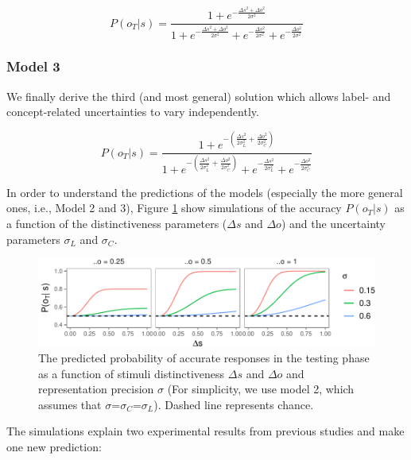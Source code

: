 \documentclass[english,,man,floatsintext]{apa6}
\theoremstyle{definition}
\theoremstyle{definition}
\theoremstyle{definition}
\theoremstyle{remark}
\begin{document}
\begin{equation} \label{eq:model2}
P(o_T|s)= \frac{1 + e^{- \frac{\Delta s^2 + \Delta o^2}{2\sigma^2}}}{1 + e^{-\frac{\Delta s^2 + \Delta o^2}{2\sigma^2}}+ e^{-\frac{\Delta s^2}{2\sigma^2}} + e^{-\frac{\Delta o^2}{2\sigma^2}}}
\end{equation}

\subsubsection{Model 3}\label{model-3}

We finally derive the third (and most general) solution which allows
label- and concept-related uncertainties to vary independently.

\begin{equation} \label{eq:model3}
P(o_T|s)= \frac{1 + e^{- (\frac{\Delta s^2}{2\sigma_L^2}+ \frac{\Delta o^2}{2\sigma_C^2})}}{1 + e^{-(\frac{\Delta s^2}{2\sigma_L^2}+ \frac{\Delta o^2}{2\sigma_C^2})}+ e^{-\frac{\Delta s^2}{2\sigma_L^2}} + e^{-\frac{\Delta o^2}{2\sigma_C^2}}}
\end{equation}

In order to understand the predictions of the models (especially the
more general ones, i.e., Model 2 and 3), Figure \ref{fig:simulation}
show simulations of the accuracy \(P(o_T|s)\) as a function of the
distinctiveness parameters (\(\Delta s\) and \(\Delta o\)) and the
uncertainty parameters \(\sigma_L\) and \(\sigma_C\).

\begin{figure}[htbp]
\centering
\includegraphics{ms_full_files/figure-latex/simulation-1.pdf}
\caption{\label{fig:simulation}The predicted probability of accurate
responses in the testing phase as a function of stimuli distinctiveness
\(\Delta s\) and \(\Delta o\) and representation precision \(\sigma\)
(For simplicity, we use model 2, which assumes that
\(\sigma\)=\(\sigma_C\)=\(\sigma_L\)). Dashed line represents chance.}
\end{figure}

The simulations explain two experimental results from previous studies
and make one new prediction:
\end{document}
